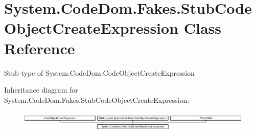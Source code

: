 \hypertarget{class_system_1_1_code_dom_1_1_fakes_1_1_stub_code_object_create_expression}{\section{System.\-Code\-Dom.\-Fakes.\-Stub\-Code\-Object\-Create\-Expression Class Reference}
\label{class_system_1_1_code_dom_1_1_fakes_1_1_stub_code_object_create_expression}
}


Stub type of System.\-Code\-Dom.\-Code\-Object\-Create\-Expression 


Inheritance diagram for System.\-Code\-Dom.\-Fakes.\-Stub\-Code\-Object\-Create\-Expression\-:\begin{figure}[H]
\begin{center}
\leavevmode
\includegraphics[height=0.982456cm]{class_system_1_1_code_dom_1_1_fakes_1_1_stub_code_object_create_expression}
\end{center}
\end{figure}
